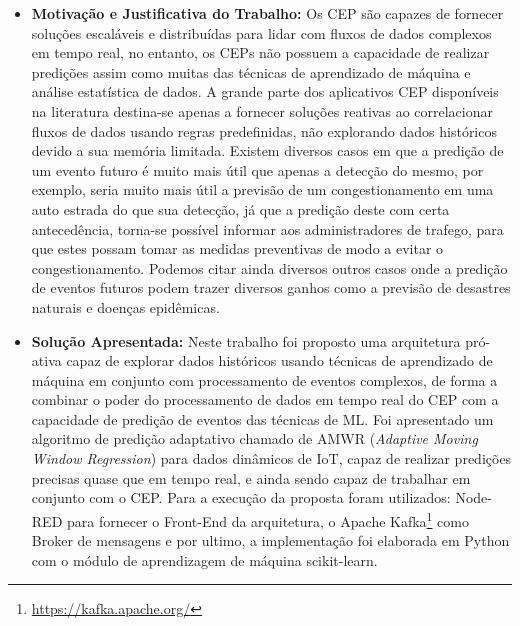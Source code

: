 \documentclass[tid,table]{texufpel} %
\begin{document}
\begin{itemize}
	\item \textbf{Motivação e Justificativa do Trabalho:} Os CEP são capazes de fornecer soluções escaláveis e distribuídas para lidar com fluxos de dados complexos em tempo real, no entanto, os CEPs  não possuem a capacidade de realizar predições assim como muitas das técnicas de aprendizado de máquina e análise estatística de dados. A grande parte dos aplicativos CEP disponíveis  na literatura destina-se apenas a fornecer soluções reativas ao correlacionar fluxos de dados usando regras predefinidas, não explorando dados históricos devido a sua memória limitada. Existem diversos casos em que a predição de um evento futuro é muito mais útil que apenas a detecção do mesmo, por exemplo, seria muito mais útil a previsão de um congestionamento em uma auto estrada do que sua detecção, já que a predição deste com certa antecedência, torna-se possível informar aos administradores de trafego, para que estes possam tomar as medidas preventivas de modo a evitar o congestionamento. Podemos citar ainda diversos outros casos onde a predição de eventos futuros podem trazer diversos ganhos como a previsão de desastres naturais e doenças epidêmicas. 
	
     \item \textbf{Solução Apresentada:} Neste trabalho foi proposto uma arquitetura pró-ativa capaz de explorar dados históricos usando técnicas de aprendizado de máquina em conjunto com processamento de eventos complexos, de forma a combinar o poder do processamento de dados em tempo real do CEP com a capacidade de predição de eventos das técnicas de ML. Foi apresentado um algoritmo de predição adaptativo chamado de AMWR (\textit{Adaptive Moving Window Regression}) para dados dinâmicos de IoT, capaz de realizar predições precisas quase que em tempo real, e ainda sendo capaz de trabalhar em conjunto com o CEP. Para a execução da proposta foram utilizados: Node-RED para fornecer o Front-End da arquitetura, o Apache Kafka\footnote{\url{https://kafka.apache.org/}} como Broker de mensagens e por ultimo, a implementação foi elaborada em Python com o módulo de aprendizagem de máquina scikit-learn.  
     
     
     

\end{itemize}
\end{document}

